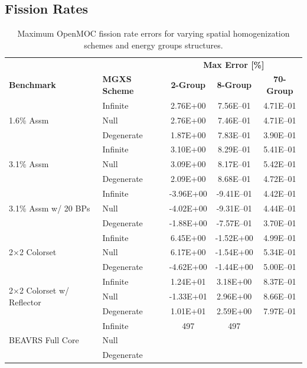 \subsection{Fission Rates}
\label{subsec:chap8-fiss-rates}

\begin{table}[h!]
  \centering
  \caption[Maximum OpenMOC fission rate errors]{Maximum OpenMOC fission rate errors for varying spatial homogenization schemes and energy groups structures.}
  \small
  \label{table:chap8-openmoc-max-fiss-rates}
  \vspace{6pt}
  \begin{tabular}{l l c c c}
  \toprule
  \rowcolor{lightgray}
  & & \multicolumn{3}{c}{\cellcolor{lightgray} \textbf{Max Error [\%]}} \\
  \multirow{-2}{*}{\cellcolor{lightgray} \bf Benchmark} &
  \multirow{-2}{*}{\cellcolor{lightgray} \bf \ac{MGXS} Scheme} &
  {\cellcolor{lightgray} \bf 2-Group} &
  {\cellcolor{lightgray} \bf 8-Group} &
  {\cellcolor{lightgray} \bf 70-Group} \\
  \midrule
\multirow{3}{*}{\parbox{2.5cm}{1.6\% Assm}} & Infinite & 2.76E+00 & 7.56E--01 & 4.71E--01 \\
& Null & 2.76E+00 & 7.46E--01 & 4.71E--01 \\
& Degenerate & 1.87E+00 & 7.83E--01 & 3.90E--01 \\
  \midrule
\multirow{3}{*}{\parbox{2.5cm}{3.1\% Assm}} & Infinite & 3.10E+00 & 8.29E--01 & 5.41E--01 \\
& Null & 3.09E+00 & 8.17E--01 & 5.42E--01 \\
& Degenerate & 2.09E+00 & 8.68E--01 & 4.72E--01 \\
  \midrule
\multirow{3}{*}{\parbox{2.5cm}{3.1\% Assm w/ 20 BPs}} & Infinite & -3.96E+00 & -9.41E--01 & 4.42E--01 \\
& Null & -4.02E+00 & -9.31E--01 & 4.44E--01 \\
& Degenerate & -1.88E+00 & -7.57E--01 & 3.70E--01 \\
  \midrule
\multirow{3}{*}{\parbox{2.5cm}{2$\times$2 Colorset}} & Infinite & 6.45E+00 & -1.52E+00 & 4.99E--01 \\
& Null & 6.17E+00 & -1.54E+00 & 5.34E--01 \\
& Degenerate & -4.62E+00 & -1.44E+00 & 5.00E--01 \\
  \midrule
\multirow{3}{*}{\parbox{2.5cm}{2$\times$2 Colorset w/ Reflector}} & Infinite & 1.24E+01 & 3.18E+00 & 8.37E--01 \\
& Null & -1.33E+01 & 2.96E+00 & 8.66E--01 \\
& Degenerate & 1.01E+01 & 2.59E+00 & 7.97E--01 \\
  \midrule
  \multirow{3}{*}{\parbox{2cm}{\ac{BEAVRS} Full Core}} & Infinite & 497 & 497 & \\
  & Null & & & \\
  & Degenerate & & & \\
  \bottomrule
\end{tabular}
\end{table}

